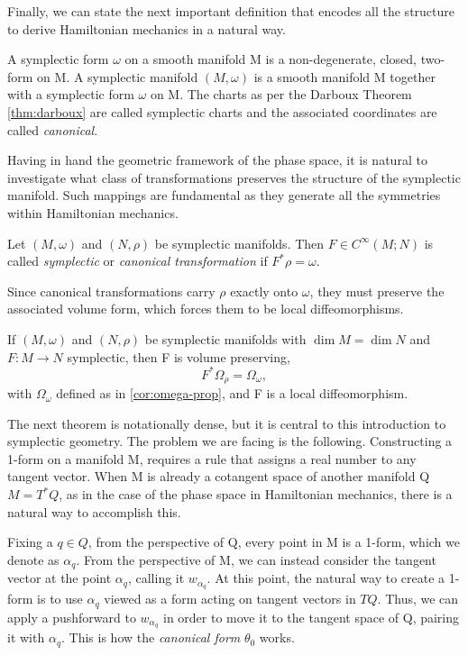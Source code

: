 \noindent Finally, we can state the next important definition that encodes all the structure to derive Hamiltonian mechanics in a natural way.

\begin{definition}\label{def:sympl-man}
	A symplectic form $\omega$ on a smooth manifold M is a non-degenerate, closed, two-form on M. A symplectic manifold $(M, \omega)$ is a smooth manifold M together with a symplectic form $\omega$ on M. The charts as per the Darboux Theorem \ref{thm:darboux} are called symplectic charts and the associated coordinates are called \emph{canonical}.
\end{definition}

Having in hand the geometric framework of the phase space, it is natural to investigate what class of transformations preserves the structure of the symplectic manifold. Such mappings are fundamental as they generate all the symmetries within Hamiltonian mechanics. 

\begin{definition}\label{def:canonical-transformation}
	Let $(M,\omega)$ and $(N,\rho)$ be symplectic manifolds. Then $F \in C^\infty(M;N)$ is called \emph{symplectic} or \emph{canonical transformation} if $F^*\rho = \omega$.
\end{definition}

\noindent Since canonical transformations carry $\rho$ exactly onto $\omega$, they must preserve the associated volume form, which forces them to be local diffeomorphisms.


\begin{proposition}
	If $(M,\omega)$ and $(N,\rho)$ be symplectic manifolds with $\dim M = \dim N$ and $F:M \to N$ symplectic, then F is volume preserving, $$F^*\Omega_\rho=\Omega_\omega,$$ with $\Omega_\omega$ defined as in \ref{cor:omega-prop}, and F is a local diffeomorphism.
\end{proposition}

The next theorem is notationally dense, but it is central to this introduction to symplectic geometry. The problem we are facing is the following. Constructing a 1-form on a manifold M, requires a rule that assigns a real number to any tangent vector. When M is already a cotangent space of another manifold Q $M = T^*Q$, as in the case of the phase space in Hamiltonian mechanics, there is a natural way to accomplish this.

\medskip 
Fixing a $q \in Q$, from the perspective of Q, every point in M is a 1-form, which we denote as $\alpha_q$. From the perspective of M, we can instead consider the tangent vector at the point $\alpha_q$, calling it $w_{\alpha_q}$. 
At this point, the natural way to create a 1-form is to use $\alpha_q$ viewed as a form acting on tangent vectors in $TQ$. Thus, we can apply a pushforward to $w_{\alpha_q}$ in order to move it to the tangent space of Q, pairing it with $\alpha_q$. This is how the \textit{canonical form} $\theta_0$ works.

